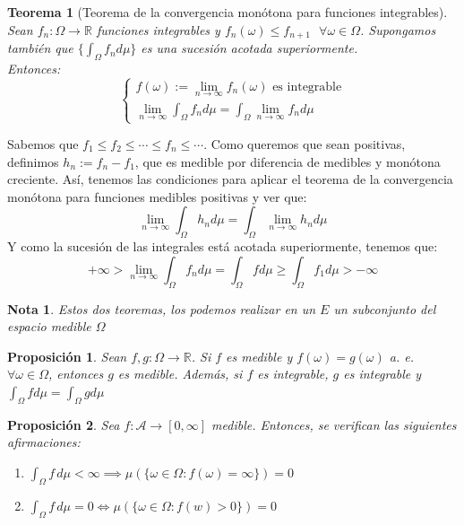 \documentclass[11pt, a4paper]{article}
\makeatletter
\newif\IfInSansMode
\let\oldsf\sffamily
\renewcommand*{\sffamily}{\oldsf\mathversion{sans}\InSansModetrue}
\let\oldnorm\normalfont
\renewcommand*{\normalfont}{\oldnorm\InSansModefalse\mathversion{normal}}
\newcommand{\R}{\mathbb{R}} \newcommand{\N}{\mathbb{N}}
\renewenvironment{proof}[1][\proofname] {\par\pushQED{\qed}\normalfont\topsep6\p@\@plus6\p@\relax\trivlist\item[\hskip\labelsep\itshape\sffamily#1\@addpunct{.}]\ignorespaces}{\popQED\endtrivlist\@endpefalse}
\theoremstyle{theorem-style}
\newtheorem{nth}{Teorema}[section]
\newtheorem{nprop}{Proposición}[section]
\theoremstyle{definition-style}
\theoremstyle{remark-style}
\newtheorem*{nota}{Nota}
\theoremstyle{example-style}
\newenvironment{nlist}
{\begin{enumerate}
    \renewcommand\labelenumi{(\emph{\roman{enumi})}}}
  {\end{enumerate}}
\makeatother
\begin{document}
\begin{nth}[Teorema de la convergencia monótona para funciones integrables]
  Sean $f_n: \Omega \to \R$ funciones integrables y $f_n(\omega) \leq f_{n+1} \ \ \ \forall \omega \in \Omega$. Supongamos también que $\{\int_\Omega f_n d\mu\}$ es una sucesión acotada superiormente.\\
  Entonces:
  $$ \begin{cases}
    f(\omega):= \lim_{n\to \infty}f_n(\omega) \text{ es integrable}\\
    \lim_{n \to \infty} \int_\Omega f_n d\mu = \int_{\Omega}\lim_{n\to \infty} f_n d\mu
  \end{cases}$$
  
\end{nth}
\begin{proof}
  Sabemos que $f_1 \leq f_2 \leq \cdots \leq f_n \leq \cdots $. Como queremos que sean positivas, definimos $h_n:= f_n - f_1$, que es medible por diferencia de medibles y monótona creciente. Así, tenemos las condiciones para aplicar el teorema de la convergencia monótona para funciones medibles positivas y ver que:
  $$ \lim_{n \to \infty} \int_\Omega h_n d\mu = \int_\Omega \lim_{n \to \infty}h_n d\mu$$
  Y como la sucesión de las integrales está acotada superiormente, tenemos que:
  $$ +\infty > \lim_{n\to \infty} \int_\Omega f_n d\mu = \int_\Omega f d\mu \geq \int_\Omega f_1 d\mu > -\infty$$
\end{proof}

\begin{nota}
  Estos dos teoremas, los podemos realizar en un $E$ un subconjunto del espacio medible $\Omega$
\end{nota}

\begin{nprop}
  Sean $f,g: \Omega \to \R$. Si $f$ es medible y $f(\omega) =  g(\omega)$ a. e. $\forall \omega \in \Omega$, entonces $g$ es medible. Además, si $f$ es integrable, $g$ es integrable y $\int_\Omega f d\mu = \int_\Omega g d\mu$
\end{nprop}

\begin{nprop} Sea $f:\mathscr A \to [0,\infty]$ medible. Entonces, se verifican las siguientes afirmaciones:
  \begin{nlist}
	
  \item $\displaystyle \int_\Omega f\, d\mu < \infty \implies \mu(\{\omega \in \Omega: f(\omega) =  \infty\}) = 0$
  \item $\displaystyle \int_\Omega f\, d\mu = 0 \iff \mu(\{\omega \in \Omega : f(w) > 0\}) = 0$
\end{nlist}
\end{nprop}
\end{document}
